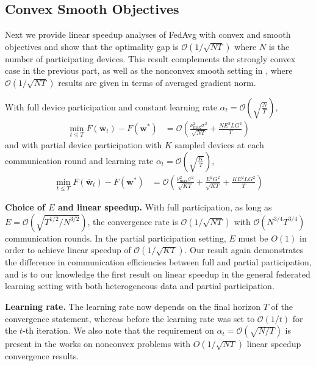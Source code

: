 \subsection{Convex Smooth Objectives}
Next we provide linear speedup analyses of FedAvg with convex and
smooth objectives and show that the optimality gap is $\mathcal{O}(1/\sqrt{NT})$
where $N$ is the number of participating devices. This result complements
the strongly convex case in the previous part, as well as the nonconvex
smooth setting in \cite{jiang2018linear,yu2019parallel,haddadpour2019convergence},
where $\mathcal{O}(1/\sqrt{NT})$ results are given in terms of averaged
gradient norm. 
\begin{theorem}
	\label{thm:SGD_cvx}With full device participation and constant learning
	rate $\alpha_{t}=\mathcal{O}(\sqrt{\frac{N}{T}})$, 
	\begin{align*}
	\min_{t\leq T}F(\overline{\mathbf{w}}_{t})-F(\mathbf{w}^{\ast}) & =\mathcal{O}\left(\frac{\nu_{\max}^{2}\sigma^{2}}{\sqrt{NT}}+\frac{NE^{2}LG^{2}}{T}\right)
	\end{align*}
	and with partial device participation with $K$ sampled devices at
	each communication round and learning rate $\alpha_{t}=\mathcal{O}(\sqrt{\frac{K}{T}})$,
	\begin{align*}
	\min_{t\leq T}F(\overline{\mathbf{w}}_{t})-F(\mathbf{w}^{\ast}) & =\mathcal{O}\left(\frac{\nu_{\max}^{2}\sigma^{2}}{\sqrt{KT}}+\frac{E^{2}G^{2}}{\sqrt{KT}}+\frac{KE^{2}LG^{2}}{T}\right)
	\end{align*}
\end{theorem}
%
\begin{remark}
	\textbf{Choice of $E$ and linear speedup. }With full participation,
	as long as $E=\mathcal{O}(\sqrt{T^{1/2}/N^{3/2}})$, the convergence
	rate is $\mathcal{O}(1/\sqrt{NT})$ with $\mathcal{O}(N^{3/4}T^{3/4})$
	communication rounds. In the partial participation setting, $E$ must
	be $O(1)$ in order to achieve linear speedup of $\mathcal{O}(1/\sqrt{KT})$.
	Our result again demonstrates the difference in communication efficiencies
	between full and partial participation, and is to our knowledge the
	first result on linear speedup in the general federated learning setting
	with both heterogeneous data and partial participation. 
\end{remark}
%
\begin{remark}
	\textbf{Learning rate. }The learning rate now depends on the final
	horizon $T$ of the convergence statement, whereas before the learning
	rate was set to $\mathcal{O}(1/t)$ for the $t$-th iteration. We
	also note that the requirement on $\alpha_{t}=\mathcal{O}(\sqrt{N/T})$
	is present in the works \cite{haddadpour2019convergence,yu2019parallel}
	on nonconvex problems with $O(1/\sqrt{NT})$ linear speedup convergence
	results. 
\end{remark}